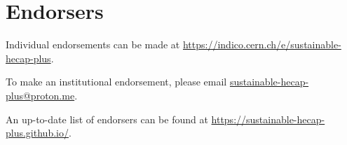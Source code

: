 \documentclass[../SustainableHEP.tex]{subfiles}
\begin{document}
\newpage


\section*{Endorsers}
{}

Individual endorsements can be made at \url{ https://indico.cern.ch/e/sustainable-hecap-plus}.  

To make an institutional endorsement, please email \href{mailto:sustainable-hecap-plus@proton.me}{sustainable-hecap-plus@proton.me}.  

An up-to-date list of endorsers can be found at \url{https://sustainable-hecap-plus.github.io/}.
\end{document}
